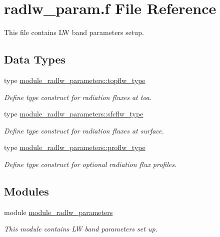\hypertarget{radlw__param_8f}{}\section{radlw\+\_\+param.\+f File Reference}
\label{radlw__param_8f}


This file contains LW band parameters setup.  


\subsection*{Data Types}
\begin{DoxyCompactItemize}
\item 
type \hyperlink{structmodule__radlw__parameters_1_1topflw__type}{module\+\_\+radlw\+\_\+parameters\+::topflw\+\_\+type}
\begin{DoxyCompactList}\small\item\em Define type construct for radiation fluxes at toa. \end{DoxyCompactList}\item 
type \hyperlink{structmodule__radlw__parameters_1_1sfcflw__type}{module\+\_\+radlw\+\_\+parameters\+::sfcflw\+\_\+type}
\begin{DoxyCompactList}\small\item\em Define type construct for radiation fluxes at surface. \end{DoxyCompactList}\item 
type \hyperlink{structmodule__radlw__parameters_1_1proflw__type}{module\+\_\+radlw\+\_\+parameters\+::proflw\+\_\+type}
\begin{DoxyCompactList}\small\item\em Define type construct for optional radiation flux profiles. \end{DoxyCompactList}\end{DoxyCompactItemize}
\subsection*{Modules}
\begin{DoxyCompactItemize}
\item 
module \hyperlink{namespacemodule__radlw__parameters}{module\+\_\+radlw\+\_\+parameters}
\begin{DoxyCompactList}\small\item\em This module contains LW band parameters set up. \end{DoxyCompactList}\end{DoxyCompactItemize}
